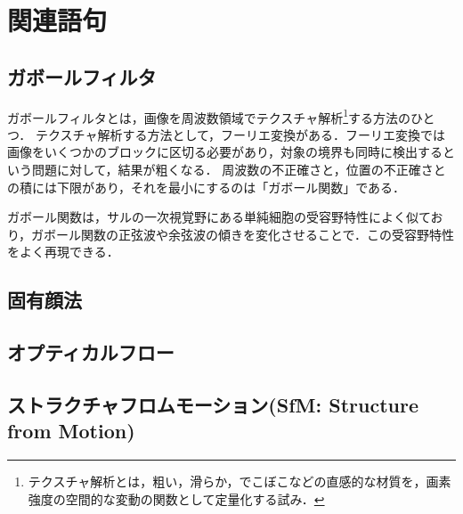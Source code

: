 \chapter{関連語句}
\section{ガボールフィルタ}
ガボールフィルタとは，画像を周波数領域でテクスチャ解析\footnote{テクスチャ解析とは，粗い，滑らか，でこぼこなどの直感的な材質を，画素強度の空間的な変動の関数として定量化する試み\cite{テクスチャ解析}．}する方法のひとつ．
テクスチャ解析する方法として，フーリエ変換がある．フーリエ変換では画像をいくつかのブロックに区切る必要があり，対象の境界も同時に検出するという問題に対して，結果が粗くなる．
周波数の不正確さと，位置の不正確さとの積には下限があり，それを最小にするのは「ガボール関数」である\cite[p.144]{認知心理学辞典}．\par
ガボール関数は，サルの一次視覚野にある単純細胞の受容野特性によく似ており，ガボール関数の正弦波や余弦波の傾きを変化させることで．この受容野特性をよく再現できる\cite[p.144]{認知心理学辞典}．
\section{固有顔法}
\section{オプティカルフロー}
\section{ストラクチャフロムモーション(SfM: Structure from Motion)}
